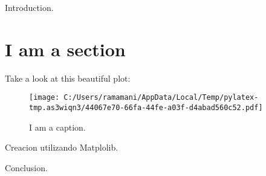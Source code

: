 \documentclass{article}%
\begin{document}
%
\normalsize%
Introduction.%
\section{I am a section}%
\label{sec:Iamasection}%
Take a look at this beautiful plot:%


\begin{figure}[htbp]%
\centering%
\texttt{[image: C:/Users/ramamani/AppData/Local/Temp/pylatex-tmp.as3wiqn3/44067e70-66fa-44fe-a03f-d4abad560c52.pdf]}%
\caption{I am a caption.}%
\end{figure}

%
Creacion utilizando Matplolib.

%
Conclusion.%
\end{document}
